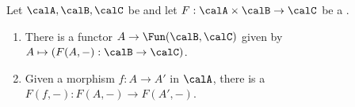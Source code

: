 \begin{lemma} \label{lemma:bifunctors_induce_functors_to_a_functor_category_and_natural_transformations}
    Let $\calA,\calB,\calC$ be  and let $F: \calA \times \calB \to \calC$ be a .
    \begin{enumerate}
        \item There is a functor $A \to \Fun(\calB, \calC)$ given by $A \mapsto (F(A,-): \calB \to \calC)$.

        \item Given a morphism $f: A \to A'$ in $\calA$, there is a  $F(f,-): F(A,-) \to F(A',-)$.
    \end{enumerate}
\end{lemma}